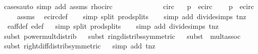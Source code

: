 \begin{isabellebody}
{\isacharparenleft}cases{\isacharcomma}auto\ simp\ add{\isacharcolon}\ assms{\isacharparenleft}{}{\isacharparenright}\ rho{\isacharunderscore}circ{\isacharparenright}\ \ \ \ \ \ \ \ \ \ \isanewline
{}\isamarkupfalse%
%
\endisatagproof
{\isafoldproof}%
%
\isadelimproof
\isanewline
%
\endisadelimproof
\ \ \isanewline
{}\isamarkupfalse%
\ {\isasymtau}{\isacharunderscore}circ{\isacharcolon}\isanewline
\ \ \ {\isachardoublequoteopen}p\ {\isasymin}\ e{\isacharunderscore}circ{\isachardoublequoteclose}\isanewline
\ \ \ {\isachardoublequoteopen}{\isasymtau}\ p\ {\isasymin}\ e{\isacharunderscore}circ{\isachardoublequoteclose}\isanewline
%
\isadelimproof
\ \ %
\endisadelimproof
%
\isatagproof
{}\isamarkupfalse%
\ assms\ \isamarkupfalse%
\ e{\isacharunderscore}circ{\isacharunderscore}def\ \isanewline
\ \ \isamarkupfalse%
{\isacharparenleft}simp\ split{\isacharcolon}\ prod{\isachardot}splits{\isacharparenright}\ \isanewline
\ \ \isamarkupfalse%
{\isacharparenleft}simp\ add{\isacharcolon}\ divide{\isacharunderscore}simps\ t{\isacharunderscore}nz{\isacharparenright}\isanewline
\ \ \isamarkupfalse%
\ e{\isacharunderscore}aff{\isacharunderscore}def\ e{\isacharprime}{\isacharunderscore}def\isanewline
\ \ \isamarkupfalse%
{\isacharparenleft}simp\ split{\isacharcolon}\ prod{\isachardot}splits{\isacharparenright}\ \isanewline
\ \ \isamarkupfalse%
{\isacharparenleft}simp\ add{\isacharcolon}\ divide{\isacharunderscore}simps\ t{\isacharunderscore}nz{\isacharparenright}\isanewline
\ \ \isamarkupfalse%
{\isacharparenleft}subst\ power{\isacharunderscore}mult{\isacharunderscore}distrib{\isacharparenright}{\isacharplus}\isanewline
\ \ \isamarkupfalse%
{\isacharparenleft}subst\ ring{\isacharunderscore}distribs{\isacharparenleft}{}{\isacharparenright}{\isacharbrackleft}symmetric{\isacharbrackright}{\isacharparenright}{\isacharplus}\isanewline
\ \ \isamarkupfalse%
{\isacharparenleft}subst\ {\isacharparenleft}{}{\isacharparenright}\ mult{\isachardot}assoc{\isacharparenright}\isanewline
\ \ \isamarkupfalse%
{\isacharparenleft}subst\ right{\isacharunderscore}diff{\isacharunderscore}distrib{\isacharbrackleft}symmetric{\isacharbrackright}{\isacharparenright}\isanewline
\ \ \isamarkupfalse%
{\isacharparenleft}simp\ add{\isacharcolon}\ t{\isacharunderscore}nz{\isacharparenright}\isanewline

\end{isabellebody}
